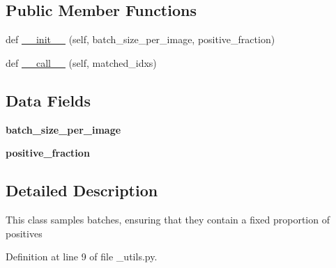 \subsection*{Public Member Functions}
\begin{DoxyCompactItemize}
\item 
def \hyperlink{classtorchvision_1_1models_1_1detection_1_1__utils_1_1BalancedPositiveNegativeSampler_a278a8a8ef3a6ca92eddbbeaafb82ee54}{\+\_\+\+\_\+init\+\_\+\+\_\+} (self, batch\+\_\+size\+\_\+per\+\_\+image, positive\+\_\+fraction)
\item 
def \hyperlink{classtorchvision_1_1models_1_1detection_1_1__utils_1_1BalancedPositiveNegativeSampler_a0c143b41388d87ce90a73e0e0c3f477c}{\+\_\+\+\_\+call\+\_\+\+\_\+} (self, matched\+\_\+idxs)
\end{DoxyCompactItemize}
\subsection*{Data Fields}
\begin{DoxyCompactItemize}
\item 
\mbox{\label{classtorchvision_1_1models_1_1detection_1_1__utils_1_1BalancedPositiveNegativeSampler_aa83be68e7b1c540d13fa796c86429b66}} 
{\bfseries batch\+\_\+size\+\_\+per\+\_\+image}
\item 
\mbox{\label{classtorchvision_1_1models_1_1detection_1_1__utils_1_1BalancedPositiveNegativeSampler_a143d4b7f14f96b223fedac1ad018273a}} 
{\bfseries positive\+\_\+fraction}
\end{DoxyCompactItemize}


\subsection{Detailed Description}
\begin{DoxyVerb}This class samples batches, ensuring that they contain a fixed proportion of positives
\end{DoxyVerb}
 

Definition at line 9 of file \+\_\+utils.\+py.



